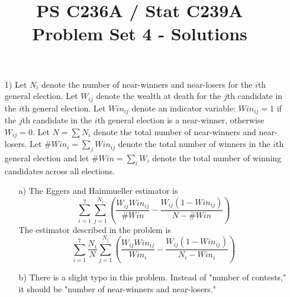 \documentclass{article}
\begin{document}
\title{PS C236A / Stat C239A \\ Problem Set 4 - Solutions}
\date{}
\maketitle
\begin{itemize}
  \item[1)]
    Let $N_i$ denote the number of near-winners and near-losers 
    for the $i$th general election.
    Let $W_{ij}$ denote the wealth at death for the $j$th candidate in the $i$th general election.
    Let $Win_{ij}$ denote an indicator variable: $Win_{ij} = 1$ if the $j$th candidate
    in the $i$th general election is a near-winner, otherwise $W_{ij} = 0$.
    Let $N = \sum N_i$ denote the total number of near-winners and near-losers.
    Let $\#Win_i = \sum _jWin_{ij}$ denote the total number of winners in the $i$th general election
    and let $\# Win = \sum_i W_i$ denote the total number of winning candidates across all
    elections.
    \begin{itemize}
      \item[a)]
        The Eggers and Hainmueller estimator is
        \begin{equation}
          \sum_{i = 1}^7\sum_{j=1}^{N_i} \left(\frac{W_{ij}Win_{ij}}{\#Win} 
            - \frac{W_{ij}(1-Win_{ij})}{N - \#Win}\right)
            \label{heresaneq1}
        \end{equation}
        The estimator described in the problem is
        \begin{equation}
          \sum_{i=1}^7 \frac{N_i}{N}\sum_{j=1}^{N_j} \left(
            \frac{W_{ij}Win_{ij}}{Win_{i}} - \frac{W_{ij}(1-Win_{ij})}{N_i - Win_{i}}
          \right)
          \label{heresaneq2}
        \end{equation}
      \item[b)]
        There is a slight typo in this problem. 
        Instead of "number of contests," it should be 
        "number of near-winners and near-losers."
        

\end{itemize}
\end{itemize}
\end{document}
